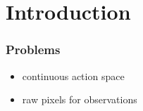 \section{Introduction}

\begin{frame}
\frametitle{Problems}
\begin{itemize}
  \item continuous action space
  \item raw pixels for observations
\end{itemize}
\end{frame}
